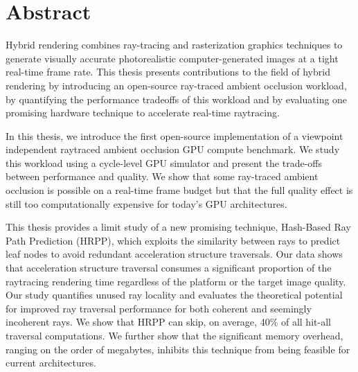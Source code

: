
\chapter{Abstract}

Hybrid rendering combines ray-tracing and rasterization graphics techniques to generate visually accurate photorealistic computer-generated images at a tight real-time frame rate. This thesis presents contributions to the field of hybrid rendering by introducing an open-source ray-traced ambient occlusion workload, by quantifying the performance tradeoffs of this workload and by evaluating one promising hardware technique to accelerate real-time raytracing.

In this thesis, we introduce the first open-source implementation of a viewpoint independent raytraced ambient occlusion GPU compute benchmark. We study this workload using a cycle-level GPU simulator and present the trade-offs between performance and quality. We show that some ray-traced ambient occlusion is possible on a real-time frame budget but that the full quality effect is still too computationally expensive for today's GPU architectures.  

This thesis provides a limit study of a new promising technique, Hash-Based Ray Path Prediction (HRPP), which exploits the similarity between rays to predict leaf nodes to avoid redundant acceleration structure traversals. Our data shows that acceleration structure traversal consumes a significant proportion of the raytracing rendering time regardless of the platform or the target image quality. Our study quantifies unused ray locality and evaluates the theoretical potential for improved ray traversal performance for both coherent and seemingly incoherent rays. We show that HRPP can skip, on average, 40\% of all hit-all traversal computations. We further show that the significant memory overhead, ranging on the order of megabytes, inhibits this technique from being feasible for current architectures.  